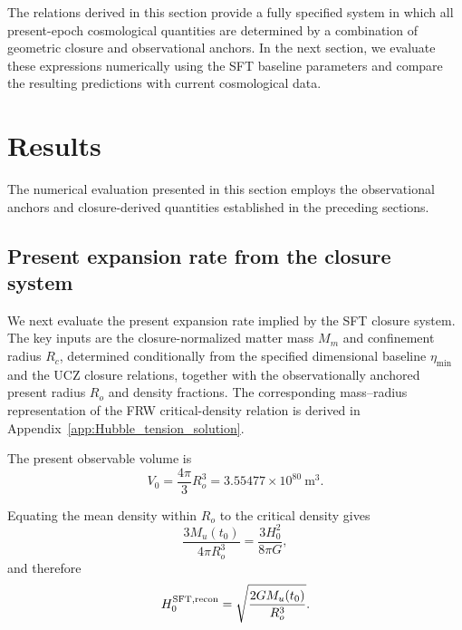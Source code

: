 \documentclass[12pt]{article}
\begin{document}
The relations derived in this section provide a fully specified system
in which all present-epoch cosmological quantities are determined by a
combination of geometric closure and observational anchors. In the next
section, we evaluate these expressions numerically using the SFT baseline
parameters and compare the resulting predictions with current
cosmological data.


\section{Results}
\label{sec:results}

The numerical evaluation presented in this section employs the
observational anchors and closure-derived quantities established in the
preceding sections.


\subsection{Present expansion rate from the closure system}
\label{subsec:H0_DE_SFT}

We next evaluate the present expansion rate implied by the SFT closure
system. The key inputs are the closure-normalized matter mass
\(M_m\) and confinement radius \(R_c\), determined conditionally from
the specified dimensional baseline $\eta_{\min}$ and the UCZ closure
relations, together with the observationally anchored present radius
\(R_o\) and density fractions. The
corresponding mass--radius representation of the FRW critical-density
relation is derived in Appendix~\ref{app:Hubble_tension_solution}.


The present observable volume is
\begin{equation}
V_0=\frac{4\pi}{3}R_o^3
=3.55477\times10^{80}~\mathrm{m^3}.
\end{equation}

Equating the mean density within $R_o$ to the critical density gives
\begin{equation}
\frac{3M_u(t_0)}{4\pi R_o^3}
=
\frac{3H_0^2}{8\pi G},
\end{equation}
and therefore
\begin{equation}
\label{eq:H0_SFT_result}
H_0^{\rm SFT,recon}
=
\sqrt{\frac{2GM_u(t_0)}{R_o^3}}.
\end{equation}
\end{document}
